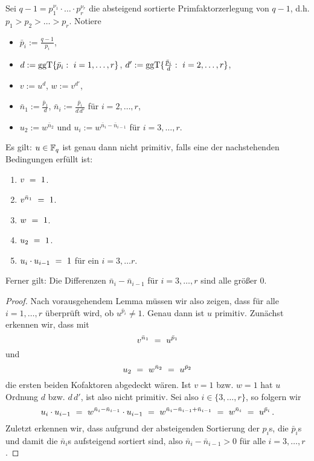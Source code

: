\begin{lemma}
  Sei $q-1 = p_1^{\nu_1}\cdot\ldots\cdot p_r^{\nu_r}$ die 
  absteigend sortierte Primfaktorzerlegung
  von $q-1$, d.h. $p_1>p_2>\ldots>p_r$. Notiere
  \begin{itemize}
    \item $\bar p_i := \tfrac{q-1}{p_i}$,
    \item $d := \ggT\{ \bar p_i:\ i=1,\ldots,r\}$, \quad
      $d' := \operatorname{ggT}\{ \frac{\bar p_i}{d}:\ i=2,\ldots,r\}$, 
    \item $v := u^d$, \quad $w := v^{d'}$,
    \item $\bar n_1 := \tfrac{\bar p_1}{d}$, \quad
      $\bar n_i := \tfrac{\bar p_i}{d\, d'}$ für $i=2,\ldots,r$,
    \item $u_2 := w^{\bar n_2}$ und 
      $u_i := w^{\bar n_i - \bar n_{i-1}}$ für $i=3,\ldots,r$.
  \end{itemize}
  Es gilt: $u \in \mathbb{F}_q$ ist genau dann nicht primitiv, falls eine der
  nachstehenden Bedingungen erfüllt ist:
  \begin{enumerate}
    \item $v \ =\  1$.
    \item $v^{\bar n_1} \ =\  1$.
    \item $w \ =\  1$.
    \item $u_2 \ =\  1$.
    \item $u_i\cdot u_{i-1} \ =\  1$ für ein $i=3,\ldots r$.
  \end{enumerate}
  Ferner gilt: Die Differenzen $\bar n_i-\bar n_{i-1}$ für 
  $i=3,\ldots,r$ sind alle größer $0$.
\end{lemma}
\begin{proof}
  Nach vorausgehendem Lemma müssen wir also zeigen, dass für alle
  $i=1,\ldots,r$ überprüft wird, ob $u^{\bar p_i} \neq 1$. Genau dann ist
  $u$ primitiv. Zunächst erkennen wir, dass mit 
  \[ v^{\bar n_1} \ =\  u^{\bar p_1}\]
  und 
  \[ u_2 \ =\  w^{\bar n_2} \ =\  u^{\bar p_2} \]
  die ersten beiden Kofaktoren abgedeckt wären.
  Ist $v = 1$ bzw. $w = 1$ hat $u$ Ordnung $d$ bzw. $d\,d'$, ist also nicht
  primitiv. Sei also $i \in \{3,\ldots,r\}$, so folgern wir
  \[ u_i \cdot u_{i-1} \ =\  
    w^{\bar n_i - \bar n_{i-1}} \cdot u_{i-1} \ =\ 
    w^{\bar n_i - \bar n_{i-1} + \bar n_{i-1}} \ =\  
    w^{\bar n_i} \ =\  u^{\bar p_i}\,.\]
  Zuletzt erkennen wir, dass aufgrund der absteigenden Sortierung der $p_i$s,
  die $\bar p_i$s und damit die $\bar n_i$s aufsteigend sortiert sind, also
  $\bar n_i - \bar n_{i-1} > 0$ für alle $i=3,\ldots,r$.
\end{proof}


